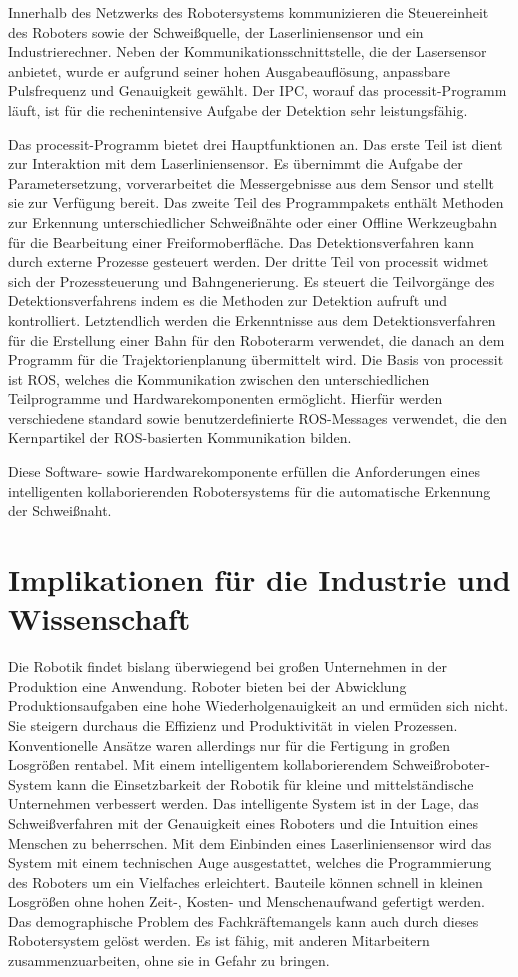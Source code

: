 Innerhalb des Netzwerks des Robotersystems kommunizieren die Steuereinheit des Roboters sowie der Schweißquelle, der Laserliniensensor und ein Industrierechner. Neben der Kommunikationsschnittstelle, die der Lasersensor anbietet, wurde er aufgrund seiner hohen Ausgabeauflösung, anpassbare Pulsfrequenz und Genauigkeit gewählt. Der IPC, worauf das processit-Programm läuft, ist für die rechenintensive Aufgabe der Detektion sehr leistungsfähig.

Das processit-Programm bietet drei Hauptfunktionen an. Das erste Teil ist dient zur Interaktion mit dem Laserliniensensor. Es übernimmt die Aufgabe der Parametersetzung, vorverarbeitet die Messergebnisse aus dem Sensor und stellt sie zur Verfügung bereit. Das zweite Teil des Programmpakets enthält Methoden zur Erkennung unterschiedlicher Schweißnähte oder einer Offline Werkzeugbahn für die Bearbeitung einer Freiformoberfläche. Das Detektionsverfahren kann durch externe Prozesse gesteuert werden. Der dritte Teil von processit widmet sich der Prozessteuerung und Bahngenerierung. Es steuert die Teilvorgänge des Detektionsverfahrens indem es die Methoden zur Detektion aufruft und kontrolliert. Letztendlich werden die Erkenntnisse aus dem Detektionsverfahren für die Erstellung einer Bahn für den Roboterarm verwendet, die danach an dem Programm für die Trajektorienplanung übermittelt wird. Die Basis von processit ist ROS, welches die Kommunikation zwischen den unterschiedlichen Teilprogramme und Hardwarekomponenten ermöglicht. Hierfür werden verschiedene standard sowie benutzerdefinierte ROS-Messages verwendet, die den Kernpartikel der ROS-basierten Kommunikation bilden. 

Diese Software- sowie Hardwarekomponente erfüllen die Anforderungen eines intelligenten kollaborierenden Robotersystems für die automatische Erkennung der Schweißnaht.

\section{Implikationen für die Industrie und Wissenschaft}

Die Robotik findet bislang überwiegend bei großen Unternehmen in der Produktion eine Anwendung. Roboter bieten bei der Abwicklung Produktionsaufgaben eine hohe Wiederholgenauigkeit an und ermüden sich nicht. Sie steigern durchaus die Effizienz und Produktivität in vielen Prozessen. Konventionelle Ansätze waren allerdings nur für die Fertigung in großen Losgrößen rentabel. Mit einem intelligentem kollaborierendem Schweißroboter-System kann die Einsetzbarkeit der Robotik für kleine und mittelständische Unternehmen verbessert werden. Das intelligente System ist in der Lage, das Schweißverfahren mit der Genauigkeit eines Roboters und die Intuition eines Menschen zu beherrschen. Mit dem Einbinden eines Laserliniensensor wird das System mit einem technischen Auge ausgestattet, welches die Programmierung des Roboters um ein Vielfaches erleichtert. Bauteile können schnell in kleinen Losgrößen ohne hohen Zeit-, Kosten- und Menschenaufwand gefertigt werden. Das demographische Problem des Fachkräftemangels kann auch durch dieses Robotersystem gelöst werden. Es ist fähig, mit anderen Mitarbeitern zusammenzuarbeiten, ohne sie in Gefahr zu bringen.


